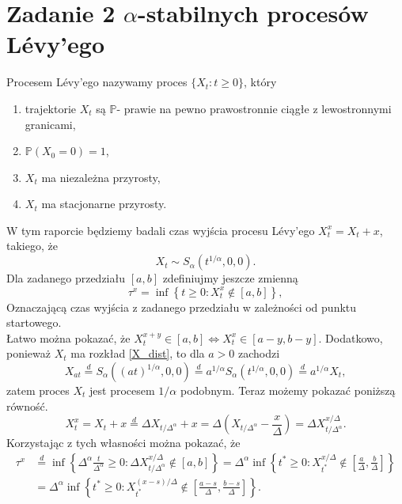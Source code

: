 \documentclass[12pt]{mwrep}
\begin{document}
	\section{Zadanie 2 $\alpha$-stabilnych procesów L\'evy'ego}
	\noindent Procesem L\'evy'ego nazywamy proces $\{X_t: t\geqslant 0\}$, który\textsuperscript{\cite{Levy_def}}
	\begin{enumerate}[label=\textbf{(\roman*)}, leftmargin=10mm]
		\item trajektorie $X_t$ są $\mathbb{P}$- prawie na pewno prawostronnie ciągłe z lewostronnymi granicami,
		\item $\mathbb{P}\left(X_0=0\right)=1$,
		\item $X_t$ ma niezależna przyrosty,
		\item $X_t$ ma stacjonarne przyrosty.
	\end{enumerate}
	W tym raporcie będziemy badali czas wyjścia procesu L\'evy'ego $X_t^x=X_t+x$, takiego, że 
	\begin{equation}\label{X_dist}
		X_t\sim S_\alpha(t^{1/\alpha},0,0).
	\end{equation}
	Dla zadanego przedziału $[a, b]$ zdefiniujmy jeszcze zmienną
	\begin{equation}
		\tau^x=\inf\left\{t\geqslant0: X_t^x\notin[a,b]\right\},
	\end{equation}
	Oznaczającą czas wyjścia z zadanego przedziału w zależności od punktu startowego.\vspace{1.5mm}\\
	Łatwo można pokazać, że $X^{x+y}_t\in[a ,b] \iff X^x_t\in[a-y, b-y]$. Dodatkowo, ponieważ $X_t$ ma rozkład \eqref{X_dist}, to dla $a>0$ zachodzi
	\begin{equation}
		X_{at} \overset{d}{=} S_\alpha\left(\left(at\right)^{1/\alpha},0,0\right)\overset{d}{=}a^{1/\alpha}S_\alpha\left(t^{1/\alpha},0,0\right)
		\overset{d}{=}a^{1/\alpha}X_t,
	\end{equation}
	zatem proces $X_t$ jest procesem $1/\alpha$ podobnym. Teraz możemy pokazać poniższą równość.
	\begin{equation}
		X^x_t=X_t+x\overset{d}{=}\Delta X_{t/\Delta^{\alpha}}+x = \Delta\left(X_{t/\Delta^{\alpha}}-\frac{x}{\Delta}\right)=\Delta X^{x/\Delta}_{t/\Delta^\alpha}.
	\end{equation}
	 Korzystając z tych własności można pokazać, że
	\begin{equation}
		\begin{split}
		\tau^x&\overset{d}{=}\inf\left\{\Delta^\alpha\frac{t}{\Delta^\alpha}\geqslant0:\Delta X^{x/\Delta}_{t/\Delta^\alpha}\notin[a, b]\right\} 	=\Delta^\alpha\inf\left\{t^*\geqslant0:X^{x/\Delta}_{t^*}\notin\left[\frac{a}{\Delta},\frac{b}{\Delta}\right]\right\}\\
		&=\Delta^\alpha\inf\left\{t^*\geqslant0:X^{(x-s)/\Delta}_{t^*}\notin\left[\frac{a-s}{\Delta},\frac{b-s}{\Delta}\right]\right\}.
		\end{split}
	\end{equation}
\end{document}
